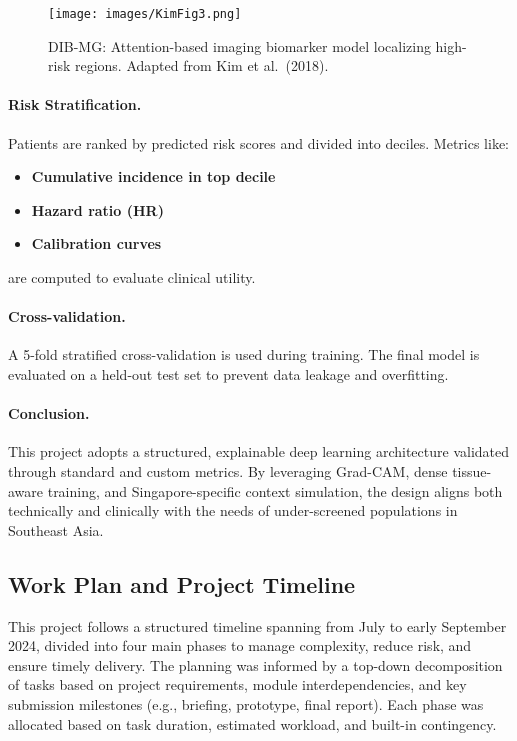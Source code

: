 \documentclass[12pt]{article}
\begin{document}
\begin{figure}[H]
    \centering
    \texttt{[image: images/KimFig3.png]}
    \caption{DIB-MG: Attention-based imaging biomarker model localizing high-risk regions. Adapted from Kim et al.\ (2018).}
    \label{fig:kim2018}
\end{figure}

\paragraph{Risk Stratification.}
Patients are ranked by predicted risk scores and divided into deciles. Metrics like:
\begin{itemize}
    \item \textbf{Cumulative incidence in top decile}
    \item \textbf{Hazard ratio (HR)}
    \item \textbf{Calibration curves}
\end{itemize}
are computed to evaluate clinical utility.

\paragraph{Cross-validation.}
A 5-fold stratified cross-validation is used during training. The final model is evaluated on a held-out test set to prevent data leakage and overfitting.

\vspace{1em}

\paragraph{Conclusion.}
This project adopts a structured, explainable deep learning architecture validated through standard and custom metrics. By leveraging Grad-CAM, dense tissue-aware training, and Singapore-specific context simulation, the design aligns both technically and clinically with the needs of under-screened populations in Southeast Asia.

\subsection{Work Plan and Project Timeline}

This project follows a structured timeline spanning from July to early September 2024, divided into four main phases to manage complexity, reduce risk, and ensure timely delivery. The planning was informed by a top-down decomposition of tasks based on project requirements, module interdependencies, and key submission milestones (e.g., briefing, prototype, final report). Each phase was allocated based on task duration, estimated workload, and built-in contingency.
\end{document}
